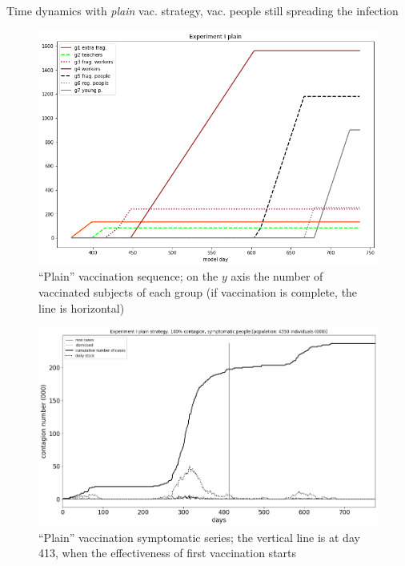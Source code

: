 \documentclass[9pt]{beamer}
\begin{document}
\begin{frame}{Time dynamics with \emph{plain} vac. strategy, vac. people still spreading the infection}

\begin{figure}[H]
\center
\includegraphics[scale=0.16]{Experiment_I_plainVaccinationSequence.png} %

\caption{``Plain'' vaccination sequence; on the $y$ axis the number of vaccinated subjects of each group (if vaccination is complete, the line is horizontal)} 
\label{Experiment_I_plainVaccinationSequence}
\end{figure}

\begin{figure}[H]
\center
\includegraphics[scale=0.16]{Experiment_I_1_plain_symptomatic_series.png} 

\caption{``Plain'' vaccination symptomatic series; the vertical line is at day 413, when the effectiveness of first vaccination starts} 
\label{Experiment_I_plainSymptomaticSeries}
\end{figure}



\end{frame}
\end{document}
